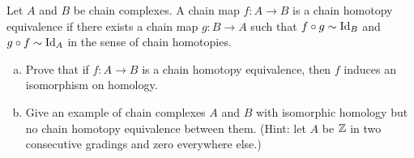 \documentclass{../../mathnotes}
\begin{document}
\begin{prop}
    Let $A$ and $B$ be chain complexes. A chain map $f:A\to B$ is a \textnormal{chain homotopy equivalence}
    if there exists a chain map $g:B\to A$ such that $f\circ g\sim\operatorname{Id}_B$ and $g\circ f\sim\operatorname{Id}_A$ in the
    sense of chain homotopies.
    \begin{enumerate}[(a)]
        \item Prove that if $f:A\to B$ is a chain homotopy equivalence, then $f$ induces an isomorphism on homology.
        \item Give an example of chain complexes $A$ and $B$ with isomorphic homology but no chain homotopy equivalence
            between them. (Hint: let $A$ be $\mathbb{Z}$ in two consecutive gradings and zero everywhere else.)
    \end{enumerate}
\end{prop}
\end{document}
